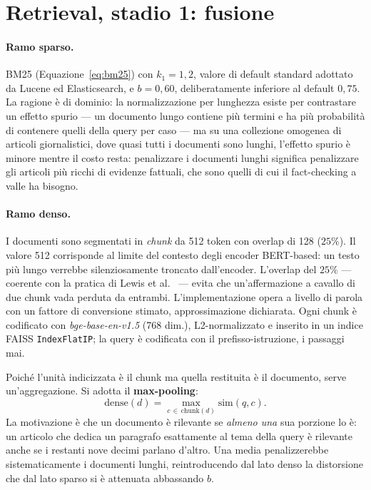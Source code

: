 \documentclass[11pt,a4paper]{report}
\begin{document}
\section{Retrieval, stadio 1: fusione}\label{sec:metodo-retrieval}

\paragraph{Ramo sparso.} BM25 (Equazione~\ref{eq:bm25}) con $k_1 = 1{,}2$, valore di default
standard adottato da Lucene ed Elasticsearch, e $b = 0{,}60$, deliberatamente inferiore al
default $0{,}75$. La ragione è di dominio: la normalizzazione per lunghezza esiste per
contrastare un effetto spurio --- un documento lungo contiene più termini e ha più probabilità di
contenere quelli della query per caso --- ma su una collezione omogenea di articoli
giornalistici, dove quasi tutti i documenti sono lunghi, l'effetto spurio è minore mentre il
costo resta: penalizzare i documenti lunghi significa penalizzare gli articoli più ricchi di
evidenze fattuali, che sono quelli di cui il fact-checking a valle ha bisogno.

\paragraph{Ramo denso.} I documenti sono segmentati in \emph{chunk} da 512 token con overlap di
128 ($25\%$). Il valore 512 corrisponde al limite del contesto degli encoder BERT-based: un testo
più lungo verrebbe silenziosamente troncato dall'encoder. L'overlap del $25\%$ --- coerente con
la pratica di Lewis et al.~\cite{rag} --- evita che un'affermazione a cavallo di due chunk vada
perduta da entrambi. L'implementazione opera a livello di parola con un fattore di conversione
stimato, approssimazione dichiarata. Ogni chunk è codificato con \emph{bge-base-en-v1.5} (768
dim.), L2-normalizzato e inserito in un indice FAISS \texttt{IndexFlatIP}; la query è codificata
con il prefisso-istruzione, i passaggi mai.

Poiché l'unità indicizzata è il chunk ma quella restituita è il documento, serve
un'aggregazione. Si adotta il \textbf{max-pooling}:
\begin{equation}\label{eq:maxpool}
\text{dense}(d) = \max_{c \,\in\, \text{chunk}(d)} \text{sim}(q, c).
\end{equation}
La motivazione è che un documento è rilevante se \emph{almeno una} sua porzione lo è: un articolo
che dedica un paragrafo esattamente al tema della query è rilevante anche se i restanti nove
decimi parlano d'altro. Una media penalizzerebbe sistematicamente i documenti lunghi,
reintroducendo dal lato denso la distorsione che dal lato sparso si è attenuata abbassando $b$.
\end{document}
